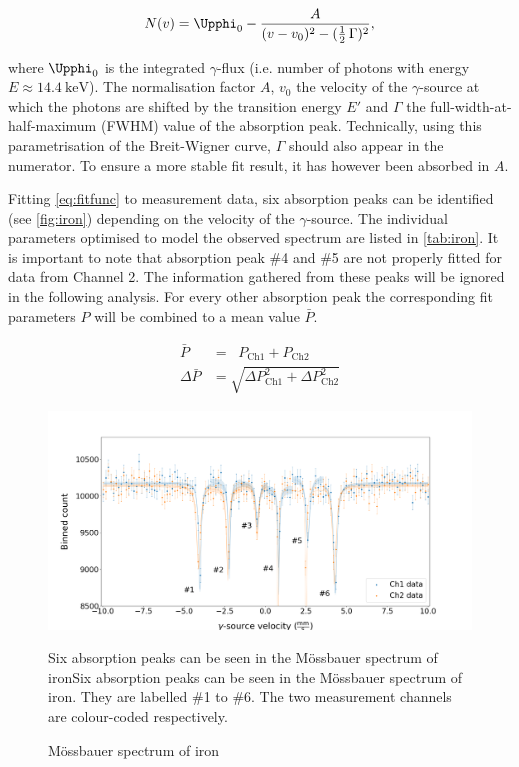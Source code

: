 \begin{equation}
\label{eq:fitfunc}
N(v) = \Upphi_0 - \frac{A}{(v-v_0)^2 - (\frac{1}{2}\,\Gamma)^2},
\end{equation}

where $\Upphi_0$ is the integrated $\gamma$-flux (i.e. number of photons with energy
$E\approx\SI{14.4}{\kilo\electronvolt}$). The normalisation factor $A$, $v_0$ the
velocity of the $\gamma$-source at which the photons are shifted by the transition
energy $E'$ and $\Gamma$ the full-width-at-half-maximum (FWHM) value of the
absorption peak. Technically, using this parametrisation of the Breit-Wigner curve,
$\Gamma$ should also appear in the numerator. To ensure a more stable fit result,
it has however been absorbed in $A$.

Fitting \autoref{eq:fitfunc} to measurement data, six absorption peaks can be
identified (see \autoref{fig:iron}) depending on the velocity of the $\gamma$-source.
The individual parameters optimised to model the observed spectrum are listed in
\autoref{tab:iron}. It is important to note that absorption peak \#4 and \#5 are not
properly fitted for data from Channel 2. The information gathered from these peaks
will be ignored in the following analysis. For every other absorption peak the
corresponding fit parameters $P$ will be combined to a mean value $\bar{P}$.



\begin{align*}
	\bar{P} &= \;\;P_\text{Ch1} + P_\text{Ch2} \\[0.5cm]
	\Delta\bar{P} &= \sqrt{\Delta P_\text{Ch1}^2 + \Delta P_\text{Ch2}^2  }
\end{align*}

\begin{figure}
	\label{fig:iron}
	\includegraphics[width=1.0\textwidth]{./fig/Iron.png}
	\caption{Mössbauer spectrum of iron}{Six absorption peaks can be seen in the
	Mössbauer spectrum of ironSix absorption peaks can be seen in the
	Mössbauer spectrum of iron. They are labelled \#1 to \#6. The two measurement
	channels are colour-coded respectively.}
\end{figure}

